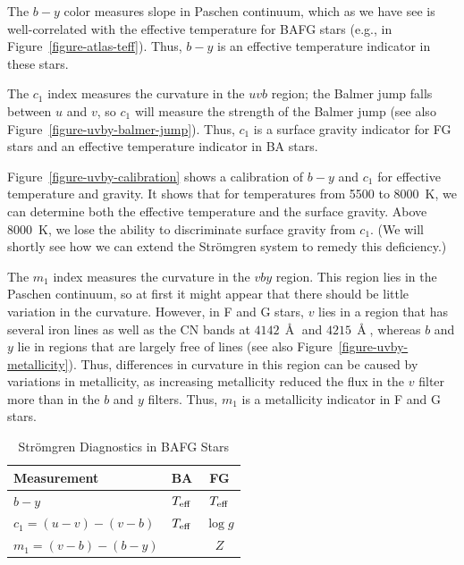 The $b-y$ color measures slope in Paschen continuum, which as we have see is well-correlated with the effective temperature for BAFG stars (e.g., in Figure~\ref{figure-atlas-teff}). Thus, $b-y$ is an effective temperature indicator in these stars.

The $c_1$ index measures the curvature in the $uvb$ region; the Balmer jump falls between $u$ and $v$, so $c_1$ will measure the strength of the Balmer jump (see also Figure~\ref{figure-uvby-balmer-jump}). Thus, $c_1$ is a surface gravity indicator for FG stars and an effective temperature indicator in BA stars.

Figure~\ref{figure-uvby-calibration} shows a calibration of $b-y$ and $c_1$ for effective temperature and gravity. It shows that for temperatures from 5500 to 8000~K, we can determine both the effective temperature and the surface gravity. Above 8000~K, we lose the ability to discriminate surface gravity from $c_1$. (We will shortly see how we can extend the Strömgren system to remedy this deficiency.)

The $m_1$ index measures the curvature in the $vby$ region. This region lies in the Paschen continuum, so at first it might appear that there should be little variation in the curvature. However,  in F and G stars, $v$ lies in a region that has several iron lines as well as the CN bands at $4142\,\Angstrom$ and $4215\,\Angstrom$, whereas $b$ and $y$ lie in regions that are largely free of lines (see also Figure~\ref{figure-uvby-metallicity}). Thus, differences in curvature in this region can be caused by variations in metallicity, as increasing metallicity reduced the flux in the $v$ filter more than in the $b$ and $y$ filters. Thus, $m_1$ is a metallicity indicator in F and G stars.

\begin{table}
\caption{Strömgren Diagnostics in BAFG Stars}
\begin{center}
\begin{tabular}{lcc}
\hline
Measurement&BA&FG\\
\hline
$b-y$&$T_\mathrm{eff}$&$T_\mathrm{eff}$\\
$c_1 = (u-v)-(v-b)$&$T_\mathrm{eff}$&$\log g$\\
$m_1 = (v-b)-(b-y)$&&$Z$\\
\hline
\end{tabular}
\end{center}
\end{table}

